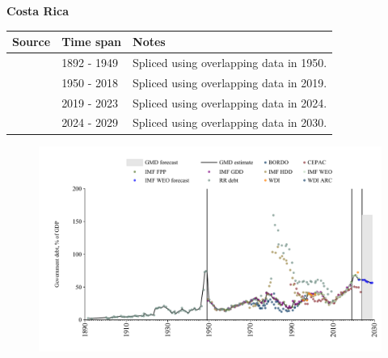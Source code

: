 \documentclass[12pt,a4paper,landscape]{article}
\begin{document}
\begin{adjustbox}{max totalsize={\paperwidth}{\paperheight},center}
\begin{minipage}[t][\textheight][t]{\textwidth}
\vspace*{0.5cm}
{}
\begin{center}
{\Large\bfseries Costa Rica}
\end{center}
\vspace{0.5cm}
\begin{table}[H]
\centering
\small
\begin{tabular}{|l|l|l|}
\hline
\textbf{Source} & \textbf{Time span} & \textbf{Notes} \\
\hline
\rowcolor{white}\cite{RR_debt}& 1892 - 1949 &Spliced using overlapping data in 1950.\\
\rowcolor{lightgray}\cite{IMF_GDD}& 1950 - 2018 &Spliced using overlapping data in 2019.\\
\rowcolor{white}\cite{IMF_FPP}& 2019 - 2023 &Spliced using overlapping data in 2024.\\
\rowcolor{lightgray}\cite{IMF_WEO_forecast}& 2024 - 2029 &Spliced using overlapping data in 2030.\\
\hline
\end{tabular}
\end{table}
\begin{figure}[H]
\centering
\includegraphics[width=\textwidth,height=0.6\textheight,keepaspectratio]{graphs/CRI_govdebt_GDP.pdf}
\end{figure}
\end{minipage}
\end{adjustbox}
\end{document}
